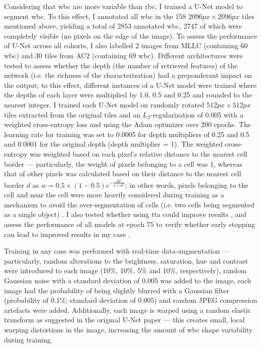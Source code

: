 Considering that \ac{wbc} are more variable than \ac{rbc}, I trained a U-Net model \cite{Ronneberger2015-do} to segment \ac{wbc}. To this effect, I annotated all \ac{wbc} in the 158 $2096px \times 2096px$ tiles mentioned above, yielding a total of 2853 annotated \ac{wbc}, 2747 of which were completely visible (no pixels on the edge of the image). To assess the performance of U-Net across all cohorts, I also labelled 2 images from MLLC (containing 60 \ac{wbc}) and 30 tiles from AC2 (containing 69 \ac{wbc}). Different architectures were tested to assess whether the depth (the number of retrieved features) of the network (i.e. the richness of the characterization) had a preponderant impact on the output; to this effect, different instances of a U-Net model were trained where the depths of each layer were multiplied by 1.0, 0.5 and 0.25 and rounded to the nearest integer. I trained each U-Net model on randomly rotated $512px \times 512px$ tiles extracted from the original tiles and an $L_2$-regularization of 0.005 with a weighted cross-entropy loss and using the Adam optimizer \cite{Kingma2014-zd} over 200 epochs. The learning rate for training was set to 0.0005 for depth multipliers of 0.25 and 0.5 and 0.0001 for the original depth (depth multiplier = 1). The weighted cross-entropy was weighted based on each pixel's relative distance to the nearest cell border --- particularly, the weight of pixels belonging to a cell was 1, whereas that of other pixels was calculated based on their distance to the nearest cell border $d$ as $w = 0.5 \times (1-0.5)e^{-\frac{2d^2}{2 \times 10^2}}$; in other words, pixels belonging to the cell and near the cell were more heavily considered during training as a mechanism to avoid the over-segmentation of cells (i.e. two cells being segmented as a single object) \cite{Ronneberger2015-do}. I also tested whether using \ac{tta} could improve results \cite{Moshkov2020-rc}, and assess the performance of all models at epoch 75 to verify whether early stopping can lead to improved results in my case \cite{Prechelt2012-xf}. 

Training in any case was performed with real-time data-augmentation --- particularly, random alterations to the brightness, saturation, hue and contrast were introduced to each image (10\%, 10\%, 5\% and 10\%, respectively), random Gaussian noise with a standard deviation of 0.005 was added to the image, each image had the probability of being slightly blurred with a Gaussian filter (probability of 0.1\%; standard deviation of 0.005) and random JPEG compression artefacts were added. Additionally, each image is warped using a random elastic transform as suggested in the original U-Net paper \cite{Ronneberger2015-do} --- this creates small, local warping distortions in the image, increasing the amount of \ac{wbc} shape variability during training. 

